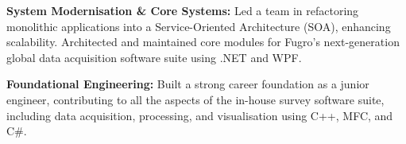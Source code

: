 \begin{cventries}
{\begin{cvitems}
        \item {\textbf{System Modernisation \& Core Systems:} Led a team in refactoring monolithic applications into a Service-Oriented Architecture (SOA), enhancing scalability. Architected and maintained core modules for Fugro's next-generation global data acquisition software suite using .NET and WPF.}
        \item {\textbf{Foundational Engineering:} Built a strong career foundation as a junior engineer, contributing to all the aspects of the in-house survey software suite, including data acquisition, processing, and visualisation using C++, MFC, and C\#.}
      \end{cvitems}
    }
\end{cventries}

